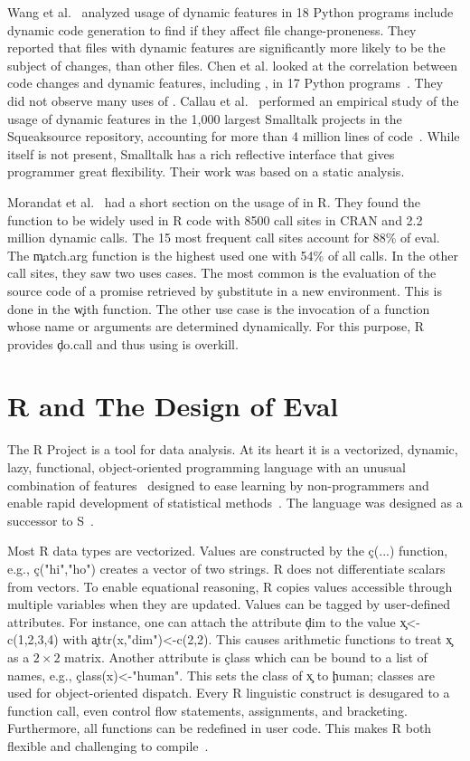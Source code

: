 \documentclass[USenglish,cleveref, autoref, thm-restate]{lipics-v2019}
\begin{document}
Wang et al.~\cite{wang} analyzed usage of dynamic features in 18 Python
programs include dynamic code generation to find if they affect file
change-proneness.  They reported that files with dynamic features are
significantly more likely to be the subject of changes, than other files.
Chen et al. looked at the correlation between code changes and dynamic
features, including \eval, in 17 Python programs~\cite{chen}. They did not
observe many uses of \eval.  Callau et al.~\cite{oscar} performed an empirical study of
the usage of dynamic features in the 1,000 largest Smalltalk projects in the
Squeaksource repository, accounting for more than 4 million lines of
code~\cite{oscar}. While \eval itself is not present, Smalltalk has a rich
reflective interface that gives programmer great flexibility. Their work was
based on a static analysis.

Morandat et al.~\cite{ecoop12} had a short section on the usage of \eval in
R. They found the \eval function to be widely used in R code with 8500 call
sites in CRAN and 2.2 million dynamic calls. The 15 most frequent call sites
account for 88\% of eval. The \c{match.arg} function is the highest used one
with 54\% of all calls. In the other call sites, they saw two uses
cases. The most common is the evaluation of the source code of a promise
retrieved by \c{substitute} in a new environment. This is done in the
\c{with} function. The other use case is the invocation of a function whose
name or arguments are determined dynamically. For this purpose, R provides
\c{do.call} and thus using \eval is overkill.

\section{R and The Design of Eval}

The R Project is a tool for data analysis.  At its heart it is a {vectorized,
  dynamic, lazy, functional, object-oriented} programming language with an
unusual combination of features~\cite{ecoop12} designed to ease learning by
non-programmers and enable rapid development of statistical
methods~\cite{R96}.  The language was designed as a successor to
S~\cite{S88}.



Most R data types are vectorized. Values are constructed by the \c{c(...)}
function, e.g., \c{c("hi","ho")} creates a vector of two strings.  R does
not differentiate scalars from vectors. To enable equational reasoning, R
copies values accessible through multiple variables when they are updated.
Values can be tagged by user-defined attributes. For instance, one can
attach the attribute \c{dim} to the value \c{x<-c(1,2,3,4)} with
\c{attr(x,"dim")<-c(2,2)}.  This causes arithmetic functions to treat \c x
as a $2 \times 2$ matrix. Another attribute is \c{class} which can be bound to a list
of names, e.g., \c{class(x)<-"human"}. This sets the class of \c{x} to
\c{human}; classes are used for object-oriented dispatch.  Every R
linguistic construct is desugared to a function call, even control flow
statements, assignments, and bracketing. Furthermore, all functions can be
redefined in user code. This makes R both flexible and challenging to
compile~\cite{dls19}.
\end{document}
